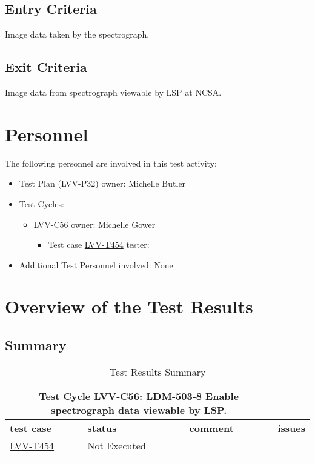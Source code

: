 \documentclass[DM,lsstdraft,STR,toc]{lsstdoc}
\begin{document}
  \subsection{Entry Criteria}
  Image data taken by the spectrograph. ~


  \subsection{Exit Criteria}
  Image data from spectrograph viewable by LSP at NCSA.~



\section{Personnel}
\label{sect:personnel}

The following personnel are involved in this test activity:

\begin{itemize}
\item Test Plan (LVV-P32) owner: Michelle Butler
\item Test Cycles:
\begin{itemize}
  \item LVV-C56 owner: 
    Michelle Gower
  \begin{itemize}
    \item Test case \href{https://jira.lsstcorp.org/secure/Tests.jspa#/testCase/LVV-T454}{LVV-T454} tester: 
  \end{itemize}
\end{itemize}
\item Additional Test Personnel involved: None
\end{itemize}

\newpage

\section{Overview of the Test Results}
\label{sect:overview}

\subsection{Summary}
\label{sect:summarytable}

\begin{longtable}{p{}p{}p{}p{}}
\toprule
  \multicolumn{3}{c}{ Test Cycle {\bf LVV-C56: LDM-503-8 Enable spectrograph data viewable by LSP.
 }} \\\hline
  {\bf \footnotesize test case} & {\bf \footnotesize status} & {\bf \footnotesize comment} & {\bf \footnotesize issues} \\\toprule
    \href{https://jira.lsstcorp.org/secure/Tests.jspa#/testCase/LVV-T454}{LVV-T454} 
    & Not Executed &  &
    \\\hline

\caption{Test Results Summary}
\label{table:summary}
\end{longtable}
\end{document}

